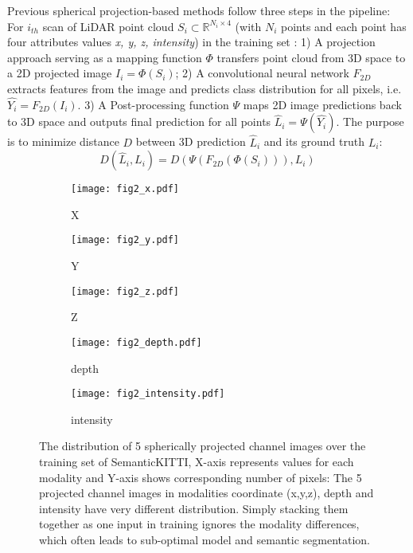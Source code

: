 \documentclass[preprint,review,3p]{elsarticle}
\begin{document}
Previous spherical projection-based methods follow three steps in the pipeline: For $i_{th}$ scan of LiDAR point cloud $S_i\subset \mathbb{R}^{N_i \times 4}$ (with $N_i$ points and each point has four attributes values \textit{x, y, z, intensity}) in the training set : 1) A projection approach serving as a mapping function $\Phi$ transfers point cloud from 3D space to a 2D projected image $I_{i}=\Phi(S_i)$; 2) A convolutional neural network $F_{2D}$ extracts features from the image and predicts class distribution for all pixels,  i.e. $\hat{Y_i}=F_{2D}(I_{i})$. 3) A Post-processing function $\Psi$ maps 2D image predictions back to 3D space and outputs final prediction for all points $\hat{L}_i=\Psi(\hat{Y_i})$. The purpose is to minimize distance $D$ between 3D prediction $\hat{L}_i$ and its ground truth $L_i$:
\begin{equation}
D(\hat{L}_i, L_i)=D(\Psi(F_{2D}(\Phi(S_i))), L_i)
\end{equation}


\begin{figure}
  \begin{subfigure}[b]{0.3\textwidth}
  \texttt{[image: fig2\_x.pdf]}
  \caption{X}
  \end{subfigure}
  \begin{subfigure}[b]{0.3\textwidth}
  \texttt{[image: fig2\_y.pdf]}
  \caption{Y}
  \end{subfigure}
  \begin{subfigure}[b]{0.3\textwidth}
  \texttt{[image: fig2\_z.pdf]}
  \caption{Z}
  \end{subfigure}
  
  \begin{subfigure}[b]{0.3\textwidth}
  \texttt{[image: fig2\_depth.pdf]}
  \caption{depth}
  \end{subfigure}
  \begin{subfigure}[b]{0.3\textwidth}
  \texttt{[image: fig2\_intensity.pdf]}
  \caption{intensity}
  \end{subfigure}

  \caption{The distribution of 5 spherically projected channel images over the training set of SemanticKITTI, X-axis represents values for each modality and Y-axis shows corresponding number of pixels: The 5 projected channel images in modalities coordinate (x,y,z), depth and intensity have very different distribution. Simply stacking them together as one input in training ignores the modality differences, which often leads to sub-optimal model and semantic segmentation.}\label{fig.DistVary}
\end{figure}
\end{document}
